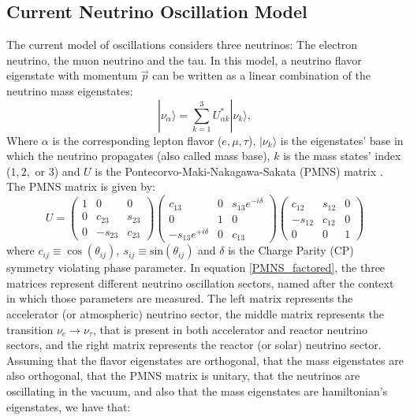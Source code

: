 \subsection{Current Neutrino Oscillation Model}
%
The current model of oscillations considers three neutrinos: The electron neutrino, the muon neutrino and the tau.
%
In this model, a neutrino flavor eigenstate with momentum $\vec{p}$ can be written as a linear combination of the neutrino mass eigenstates:
%
\begin{equation}
	|\nu_\alpha \rangle = \sum_{k=1}^3 U^*_{\alpha k} |\nu_k \rangle,
	\label{nu_state}
\end{equation}
%
Where $\alpha$ is the corresponding lepton flavor ($e, \mu, \tau$), $|\nu_k\rangle$ is the eigenstates' base in which the neutrino propagates (also called mass base), $k$ is the mass states' index ($1, 2,$ or $3$) and $U$ is the Pontecorvo-Maki-Nakagawa-Sakata (PMNS) matrix \cite{MNS, PMNS}. The PMNS matrix is given by:
%
\begin{equation}
	U = \left( \begin{array}{ccc} 
	1 & 0 & 0 \\ 
	0 & c_{23} & s_{23} \\
	0 & -s_{23} & c_{23} \end{array} \right)
	\left(\begin{array}{ccc} 
	c_{13} & 0 & s_{13}e^{-i\delta} \\ 
	0 & 1 & 0 \\ 
	-s_{13}e^{+i\delta} & 0 & c_{13} \end{array}\right)
	\left(\begin{array}{ccc}
	c_{12} & s_{12} & 0 \\ 
	-s_{12} & c_{12} & 0 \\ 
	0 & 0 & 1 \end{array} \right)
	\label{PMNS_factored}
\end{equation}
%
where $c_{ij} \equiv \cos(\theta_{ij}), \ s_{ij} \equiv \text{sin}(\theta_{ij})$ and $\delta$ is the Charge Parity (CP) symmetry violating phase parameter.
In equation \ref{PMNS_factored}, the three matrices represent different neutrino oscillation sectors, named after the context in which those parameters are measured. The left matrix represents the accelerator (or atmospheric) neutrino sector, the middle matrix represents the transition $\nu_e \rightarrow \nu_\tau$, that is present in both accelerator and reactor neutrino sectors, and the right matrix represents the reactor (or solar) neutrino sector.
%
Assuming that the flavor eigenstates are orthogonal, that the mass eigenstates are also orthogonal, that the PMNS matrix is unitary, that the neutrinos are oscillating in the vacuum, and also that the mass eigenstates are hamiltonian's eigenstates, we have that:
